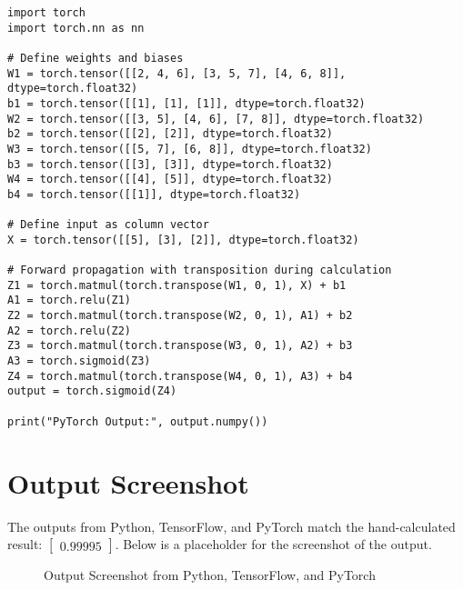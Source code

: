 \documentclass[a4paper,12pt]{article}
\begin{document}
\lstset{language=Python}
\begin{lstlisting}
import torch
import torch.nn as nn

# Define weights and biases
W1 = torch.tensor([[2, 4, 6], [3, 5, 7], [4, 6, 8]], dtype=torch.float32)
b1 = torch.tensor([[1], [1], [1]], dtype=torch.float32)
W2 = torch.tensor([[3, 5], [4, 6], [7, 8]], dtype=torch.float32)
b2 = torch.tensor([[2], [2]], dtype=torch.float32)
W3 = torch.tensor([[5, 7], [6, 8]], dtype=torch.float32)
b3 = torch.tensor([[3], [3]], dtype=torch.float32)
W4 = torch.tensor([[4], [5]], dtype=torch.float32)
b4 = torch.tensor([[1]], dtype=torch.float32)

# Define input as column vector
X = torch.tensor([[5], [3], [2]], dtype=torch.float32)

# Forward propagation with transposition during calculation
Z1 = torch.matmul(torch.transpose(W1, 0, 1), X) + b1
A1 = torch.relu(Z1)
Z2 = torch.matmul(torch.transpose(W2, 0, 1), A1) + b2
A2 = torch.relu(Z2)
Z3 = torch.matmul(torch.transpose(W3, 0, 1), A2) + b3
A3 = torch.sigmoid(Z3)
Z4 = torch.matmul(torch.transpose(W4, 0, 1), A3) + b4
output = torch.sigmoid(Z4)

print("PyTorch Output:", output.numpy())
\end{lstlisting}

\section{Output Screenshot}
The outputs from Python, TensorFlow, and PyTorch match the hand-calculated result: \(\begin{bmatrix} 0.99995 \end{bmatrix}\). Below is a placeholder for the screenshot of the output.

\begin{figure}[H]  %
    \centering
    \caption{Output Screenshot from Python, TensorFlow, and PyTorch}
    \label{fig:output_screenshot}
\end{figure}

\end{document}
